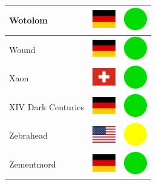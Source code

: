 \documentclass[12pt, a4paper, twoside]{report}
\begin{document}
\begin{center}
\begin{longtable}{|p{5cm}|p{2cm}|p{2cm}|}
 Wotolom                                                    & \includegraphics[width=1cm]{../4x3/de} &   \includegraphics[width=1cm]{../likes/y} \\ \hline
 Wound                                                      & \includegraphics[width=1cm]{../4x3/de} &   \includegraphics[width=1cm]{../likes/y} \\ \hline
 Xaon                                                       & \includegraphics[width=1cm]{../4x3/ch} &   \includegraphics[width=1cm]{../likes/y} \\ \hline
 XIV Dark Centuries                                         & \includegraphics[width=1cm]{../4x3/de} &   \includegraphics[width=1cm]{../likes/y} \\ \hline
 Zebrahead                                                  & \includegraphics[width=1cm]{../4x3/us} &   \includegraphics[width=1cm]{../likes/m} \\ \hline
 Zementmord                                                 & \includegraphics[width=1cm]{../4x3/de} &   \includegraphics[width=1cm]{../likes/y} \\ \hline

\end{longtable}
\end{center}
\end{document}
